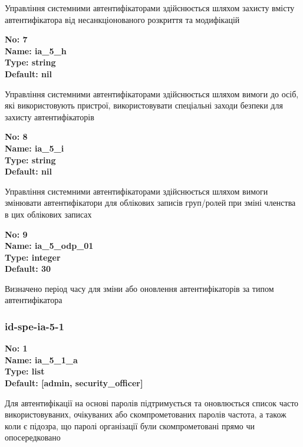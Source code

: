 \documentclass{article}
\begin{document}
{\footnotesize Управління системними автентифікаторами здійснюється шляхом захисту вмісту автентифікатора від несанкціонованого розкриття та модифікацій}


{\footnotesize\bfseries
No: 7\\
Name: ia\_\allowbreak{}5\_\allowbreak{}h\\
Type: string\\
Default: nil
}

{\footnotesize Управління системними автентифікаторами здійснюється шляхом вимоги до осіб, які використовують пристрої, використовувати спеціальні заходи безпеки для захисту автентифікаторів}


{\footnotesize\bfseries
No: 8\\
Name: ia\_\allowbreak{}5\_\allowbreak{}i\\
Type: string\\
Default: nil
}

{\footnotesize Управління системними автентифікаторами здійснюється шляхом вимоги змінювати автентифікатори для облікових записів груп/ролей при зміні членства в цих облікових записах}


{\footnotesize\bfseries
No: 9\\
Name: ia\_\allowbreak{}5\_\allowbreak{}odp\_\allowbreak{}01\\
Type: integer\\
Default: 30
}

{\footnotesize Визначено період часу для зміни або оновлення автентифікаторів за типом автентифікатора}




\subsubsection{id-spe-ia-5-1}


\vspace{10pt}
{\footnotesize\bfseries
No: 1\\
Name: ia\_\allowbreak{}5\_\allowbreak{}1\_\allowbreak{}a\\
Type: list\\
Default: [\textquotedbl{}admin\textquotedbl{}, \textquotedbl{}security\_\allowbreak{}officer\textquotedbl{}]
}

{\footnotesize Для автентифікації на основі паролів підтримується та оновлюється список часто використовуваних, очікуваних або скомпрометованих паролів частота, а також коли є підозра, що паролі організації були скомпрометовані прямо чи опосередковано}
\end{document}
